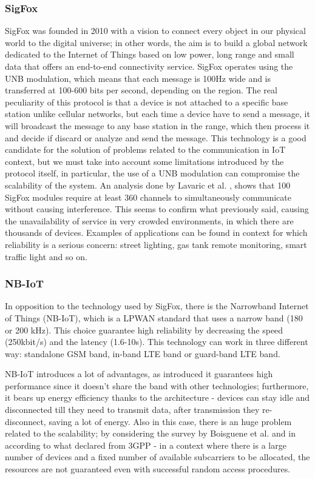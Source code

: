 \documentclass[sigconf]{acmart}
\begin{document}
      \subsubsection{SigFox}
      SigFox was founded in 2010 with a vision to connect every object in our physical world to the digital universe; in other words, the aim is to build a global network dedicated to the Internet of Things based on low power, long range and small data that offers an end-to-end connectivity service.
      SigFox operates using the UNB modulation, which means that each message is 100Hz wide and is transferred at 100-600 bits per second, depending on the region. The real peculiarity of this protocol is that a device is not attached to a specific base station unlike cellular networks, but each time a device have to send a message, it will broadcast the message to any base station in the range, which then process it and decide if discard or analyze and send the message.
      This technology is a good candidate for the solution of problems related to the communication in IoT context, but we must take into account some limitations introduced by the protocol itself, in particular, the use of a UNB modulation can compromise the scalability of the system. An analysis done by Lavaric et al. \cite{lavaric}, shows  that 100 SigFox modules require at least 360 channels to simultaneously communicate without causing interference. This seems to confirm what previously said, causing the unavailability of service in very crowded environments, in which there are thousands of devices.
      Examples of applications can be found in context for which reliability is a serious concern: street lighting, gas tank remote monitoring, smart traffic light and so on.
      \subsubsection{NB-IoT}
      In opposition to the technology used by SigFox, there is the Narrowband Internet of Things (NB-IoT), which is a LPWAN standard that uses a narrow band (180 or 200 kHz). This choice guarantee high reliability by decreasing the speed (250kbit/s) and the latency (1.6-10s). This technology can work in three different way: standalone GSM band,  in-band LTE band or guard-band LTE band.
      
      NB-IoT introduces a lot of advantages, as introduced it guarantees high performance since it doesn't share the band with other technologies; furthermore, it bears up energy efficiency thanks to the architecture - devices can stay idle and disconnected till they need to transmit data, after transmission they re-disconnect, saving a lot of energy. Also in this case, there is an huge problem related to the scalability; by considering the survey by Boisguene et al. \cite{boisguene} and in according to what declared from 3GPP - in a context where there is a large number of devices and a fixed number of available subcarriers to be allocated, the resources are not guaranteed even with successful random access procedures.
      
\end{document}
